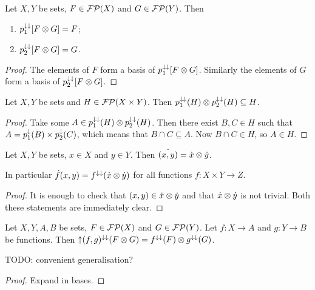 \begin{lemma} \label{projectionsOfProductFilter}
Let $X,Y$ be sets, $F\in \operatorname{\mathcal{FP}}(X)$ and $G\in \operatorname{\mathcal{FP}}(Y)$. Then
\begin{enumerate}
\item $p_1^{\downarrow\downarrow}[F\otimes G] = F$;
\item $p_2^{\downarrow\downarrow}[F\otimes G] = G$.
\end{enumerate}
\end{lemma}
\begin{proof}
The elements of $F$ form a basis of $p_1^{\downarrow\downarrow}[F\otimes G]$. Similarly the elements of $G$ form a basis of $p_2^{\downarrow\downarrow}[F\otimes G]$.
\end{proof}

\begin{lemma} \label{filterFactorisationInequality}
Let $X,Y$ be sets and $H \in \operatorname{\mathcal{FP}}(X\times Y)$. Then $p_1^{\downarrow\downarrow}(H)\otimes p_2^{\downarrow\downarrow}(H) \subseteq H$.
\end{lemma}
\begin{proof}
Take some $A\in p_1^{\downarrow\downarrow}(H)\otimes p_2^{\downarrow\downarrow}(H)$. Then there exist $B,C\in H$ such that $A = p_1^\downarrow(B)\times p_2^\downarrow(C)$, which means that $B\cap C\subseteq A$. Now $B\cap C \in H$, so $A\in H$.
\end{proof}

\begin{lemma} \label{productPrincipalUltrafilter}
Let $X,Y$ be sets, $x\in X$ and $y\in Y$. Then $\dot{(x,y)} = \dot{x} \otimes \dot{y}$.
\end{lemma}
In particular $\dot{f}(x,y) = f^{\downarrow\downarrow}(\dot{x}\otimes\dot{y})$ for all functions $f: X\times Y \to Z$.
\begin{proof}
It is enough to check that $(x,y)\in\dot{x}\otimes\dot{y}$ and that $\dot{x}\otimes\dot{y}$ is not trivial. Both these statements are immediately clear.
\end{proof}

\begin{lemma} \label{functionsOfProductFilters}
Let $X,Y, A,B$ be sets, $F\in \operatorname{\mathcal{FP}}(X)$ and $G\in \operatorname{\mathcal{FP}}(Y)$. Let $f: X\to A$ and $g: Y\to B$ be functions. Then $\operatorname{\uparrow} (f,g)^{\downarrow\downarrow}(F\otimes G) = f^{\downarrow\downarrow}(F)\otimes g^{\downarrow\downarrow}(G)$.
\end{lemma}
TODO: convenient generalisation?
\begin{proof}
Expand in bases.
\end{proof}

